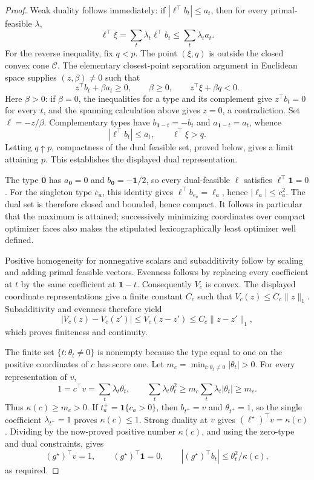 \documentclass{article}
\begin{document}
\begin{proof}
Weak duality follows immediately: if \(|\ell^\top b_t|\le a_t\), then for every primal-feasible \(\lambda\),
\[
\ell^\top\xi=\sum_t\lambda_t\ell^\top b_t
 \le \sum_t\lambda_ta_t.
\]
For the reverse inequality, fix \(q<p\).  The point \((\xi,q)\) is outside the closed convex cone \(\mathcal C\).  The elementary closest-point separation argument in Euclidean space supplies \((z,\beta)\ne0\) such that
\[
z^\top b_t+\beta a_t\ge0,\qquad \beta\ge0,\qquad
z^\top\xi+\beta q<0.
\]
Here \(\beta>0\): if \(\beta=0\), the inequalities for a type and its complement give \(z^\top b_t=0\) for every \(t\), and the spanning calculation above gives \(z=0\), a contradiction.  Set \(\ell=-z/\beta\).  Complementary types have \(b_{\mathbf1-t}=-b_t\) and \(a_{\mathbf1-t}=a_t\), whence
\[
|\ell^\top b_t|\le a_t,\qquad \ell^\top\xi>q.
\]
Letting \(q\uparrow p\), compactness of the dual feasible set, proved below, gives a limit attaining \(p\).  This establishes the displayed dual representation.

The type \(\mathbf0\) has \(a_{\mathbf0}=0\) and \(b_{\mathbf0}=-\mathbf1/2\), so every dual-feasible \(\ell\) satisfies \(\ell^\top\mathbf1=0\).  For the singleton type \(e_a\), this identity gives \(\ell^\top b_{e_a}=\ell_a\), hence \(|\ell_a|\le c_a^2\).  The dual set is therefore closed and bounded, hence compact.  It follows in particular that the maximum is attained; successively minimizing coordinates over compact optimizer faces also makes the stipulated lexicographically least optimizer well defined.

Positive homogeneity for nonnegative scalars and subadditivity follow by scaling and adding primal feasible vectors.  Evenness follows by replacing every coefficient at \(t\) by the same coefficient at \(\mathbf1-t\).  Consequently \(V_c\) is convex.  The displayed coordinate representations give a finite constant \(C_c\) such that \(V_c(z)\le C_c\|z\|_1\).  Subadditivity and evenness therefore yield
\[
|V_c(z)-V_c(z')|\le V_c(z-z')\le C_c\|z-z'\|_1,
\]
which proves finiteness and continuity.

The finite set \(\{t:\theta_t\ne0\}\) is nonempty because the type equal to one on the positive coordinates of \(c\) has score one.  Let
\(m_c=\min_{t:\theta_t\ne0}|\theta_t|>0\).  For every representation of \(v\),
\[
1=c^\top v=\sum_t\lambda_t\theta_t,
\qquad
\sum_t\lambda_t\theta_t^2
 \ge m_c\sum_t\lambda_t|\theta_t|
 \ge m_c.
\]
Thus \(\kappa(c)\ge m_c>0\).  If \(t^+_a=\mathbf1\{c_a>0\}\), then \(b_{t^+}=v\) and \(\theta_{t^+}=1\), so the single coefficient \(\lambda_{t^+}=1\) proves \(\kappa(c)\le1\).  Strong duality at \(v\) gives \((\ell^\star)^\top v=\kappa(c)\).  Dividing by the now-proved positive number \(\kappa(c)\), and using the zero-type and dual constraints, gives
\[
(g^\star)^\top v=1,\qquad (g^\star)^\top\mathbf1=0,\qquad
|(g^\star)^\top b_t|\le\theta_t^2/\kappa(c),
\]
as required.
\end{proof}
\end{document}
